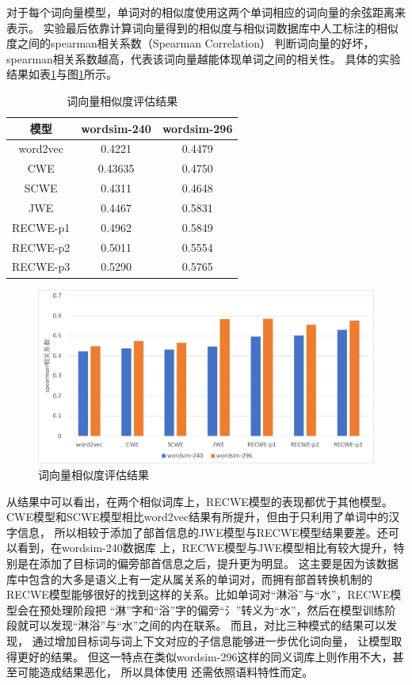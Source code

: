对于每个词向量模型，单词对的相似度使用这两个单词相应的词向量的余弦距离来表示。
实验最后依靠计算词向量得到的相似度与相似词数据库中人工标注的相似度之间的spearman相关系数（Spearman Correlation）
判断词向量的好坏，spearman相关系数越高，代表该词向量越能体现单词之间的相关性。
具体的实验结果如表\ref{word_vec_result}与图\ref{word_vec_result_pic}所示。
\begin{table}[ht]
    \caption{词向量相似度评估结果}
    \begin{tabular}{|c|c|c|}
        \hline
        模型 & wordsim-240 & wordsim-296 \\
        \hline
        word2vec & 0.4221 & 0.4479 \\
        \hline
        CWE & 0.43635 & 0.4750 \\
        \hline
        SCWE & 0.4311 & 0.4648 \\
        \hline
        JWE & 0.4467 & 0.5831 \\
        \hline
        RECWE-p1 & 0.4962 & 0.5849 \\
        \hline
        RECWE-p2 & 0.5011 & 0.5554 \\
        \hline
        RECWE-p3 & 0.5290 & 0.5765 \\
        \hline
    \end{tabular}
    \label{word_vec_result}
    \end{table}
    \begin{figure}[!h]
        \includegraphics[scale=0.45]{picture/word_sim.pdf}
        \caption{词向量相似度评估结果}
        \label{word_vec_result_pic}
    \end{figure}

从结果中可以看出，在两个相似词库上，RECWE模型的表现都优于其他模型。
CWE模型和SCWE模型相比word2vec结果有所提升，但由于只利用了单词中的汉字信息，
所以相较于添加了部首信息的JWE模型与RECWE模型结果要差。还可以看到，在wordsim-240数据库
上，RECWE模型与JWE模型相比有较大提升，特别是在添加了目标词的偏旁部首信息之后，提升更为明显。
这主要是因为该数据库中包含的大多是语义上有一定从属关系的单词对，而拥有部首转换机制的
RECWE模型能够很好的找到这样的关系。比如单词对“淋浴”与“水”，RECWE模型会在预处理阶段把
“淋”字和“浴”字的偏旁“氵”转义为“水”，然后在模型训练阶段就可以发现“淋浴”与“水”之间的内在联系。
而且，对比三种模式的结果可以发现，
通过增加目标词与词上下文对应的子信息能够进一步优化词向量，
让模型取得更好的结果。
但这一特点在类似wordsim-296这样的同义词库上则作用不大，甚至可能造成结果恶化，
所以具体使用
还需依照语料特性而定。

